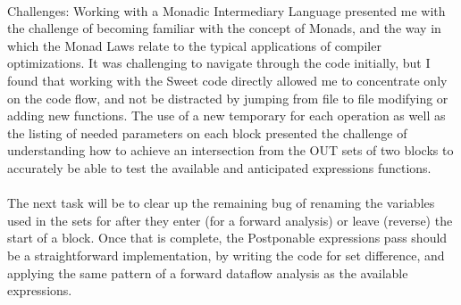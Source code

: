 \documentclass[14pt]{article}
\begin{document}
\paragraph{}
Challenges: Working with a Monadic Intermediary Language presented me with the challenge of becoming familiar with the concept of Monads, and the way in which the Monad Laws relate to the typical applications of compiler optimizations. It was challenging to navigate through the code initially, but I found that working with the Sweet code directly allowed me to concentrate only on the code flow, and not be distracted by jumping from file to file modifying or adding new functions. The use of a new temporary for each operation as well as the listing of needed parameters on each block presented the challenge of understanding how to achieve an intersection from the OUT sets of two blocks to accurately be able to test the available and anticipated expressions functions.
\paragraph{}
The next task will be to clear up the remaining bug of renaming the variables used in the sets for after they enter (for a forward analysis) or leave (reverse) the start of a block. Once that is complete, the Postponable expressions pass should be a straightforward implementation, by writing the code for set difference, and applying the same pattern of a forward dataflow analysis as the available expressions. 
\end{document}
